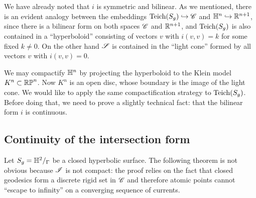 We have already noted that $i$ is symmetric and bilinear. 
As we mentioned, there is an evident analogy between the embeddings ${\rm Teich}(S_g)\hookrightarrow \mathscr{C}$ and $\mathbb{H}^n\hookrightarrow \mathbb{R}^{n+1}$, since there is a bilinear form on both spaces $\mathscr{C}$ and $\mathbb{R}^{n+1}$, and ${\rm Teich}(S_g)$ is also contained in a ``hyperboloid'' consisting of vectors $v$ with $i(v,v) = k$ for some fixed $k \neq 0$. On the other hand $\mathscr{S}$ is contained in the ``light cone'' formed by all vectors $v$ with $i(v,v)=0$. 

We may compactify $\mathbb{H}^n$ by projecting the hyperboloid to the Klein model $K^n\subset \mathbb{RP}^{n}$. Now $K^n$ is an open disc, whose boundary is the image of the light cone. We would like to apply the same compactification strategy to ${\rm Teich}(S_g)$. Before doing that, we need to prove a slightly technical fact: that the bilinear form $i$ is continuous. 

\subsection{Continuity of the intersection form}
Let $S_g=\mathbb{H}^2/_\Gamma$ be a closed hyperbolic surface.
The following theorem is not obvious because $\mathscr{I}$ is not compact: the proof relies on the fact that closed geodesics form a discrete rigid set in $\mathscr{C}$ and therefore atomic points cannot ``escape to infinity'' on a converging sequence of currents.

